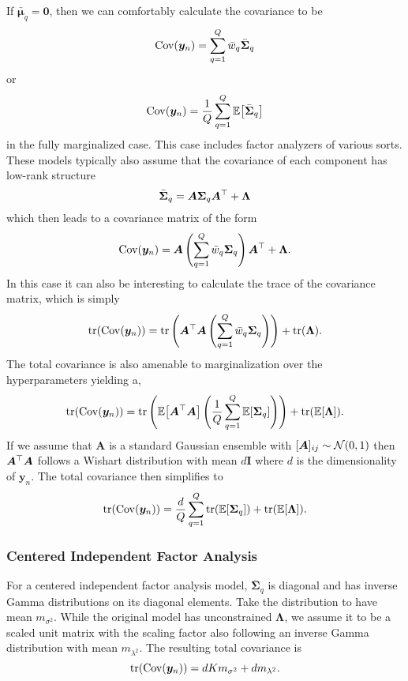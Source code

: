 \documentclass{article}
\newcommand{\mix}{\bm{A}}
\newcommand{\obs}{y}
\newcommand{\obsvec}{\bm{\obs}}
\newcommand{\mean}{\mu}
\newcommand{\meanvec}{\bm{\mean}}
\newcommand{\scale}{\sigma}
\newcommand{\scalesq}{\scale^2}
\newcommand{\sourcecov}{\bm{\Sigma}}
\newcommand{\weight}{w}
\newcommand{\compweight}{\bar{\weight}}
\newcommand{\compmeanvec}{\bar{\meanvec}}
\newcommand{\compcov}{\bar{\bm{\Sigma}}}
\newcommand{\noisecov}{\bm{\Lambda}}
\newcommand{\noisescalesq}{\lambda^2}
\begin{document}
If $\compmeanvec_q=\bm{0}$, then we can comfortably calculate the covariance to be
\begin{equation}
\Cov{\obsvec_n}=\sum_{q=1}^{Q}\compweight_q\compcov_q
\end{equation}
or
\begin{equation}
\Cov{\obsvec_n}=\frac{1}{Q}\sum_{q=1}^{Q}\E{\compcov_q}
\end{equation}
in the fully marginalized case.
This case includes factor analyzers of various sorts. These models typically also assume that the covariance of each component has low-rank structure
\begin{equation}
\compcov_q=\mix \sourcecov_q\mix\T+\noisecov
\end{equation}  
which then leads to a covariance matrix of the form
\begin{equation}
\Cov{\obsvec_n}=\mix\left(\sum_{q=1}^{Q}\compweight_q\sourcecov_q\right)\mix\T+\noisecov.
\end{equation}
In this case it can also be interesting to calculate the trace of the covariance matrix, which is simply
\begin{equation}
\trace(\Cov{\obsvec_n})=\trace\left(\mix\T\mix\left(\sum_{q=1}^{Q}\compweight_q\sourcecov_q\right)\right)+\trace(\noisecov).
\end{equation}
The total covariance is also amenable to marginalization over the hyperparameters yielding a, 
\begin{equation}
\trace(\Cov{\obsvec_n})=\trace\left(\E{\mix\T\mix}\left(\frac{1}{Q}\sum_{q=1}^{Q}\E{\sourcecov_q}\right)\right)+\trace(\E{\noisecov}).
\end{equation}
If we assume that $\mix$ is a standard Gaussian ensemble with $[\mix]_{ij}\sim \gaussrnd(0,1)$ then $\mix\T\mix$ follows a Wishart distribution with mean $d\bm{I}$ where $d$ is the dimensionality of $\obsvec_n$. The total covariance then simplifies to 
\begin{equation}
\label{eq:totalcov}
\trace(\Cov{\obsvec_n})=\frac{d}{Q}\sum_{q=1}^{Q}\trace(\E{\sourcecov_q})+\trace(\E{\noisecov}).
\end{equation}
\subsubsection{Centered Independent Factor Analysis}
For a centered independent factor analysis model, $\compcov_q$ is diagonal and has inverse Gamma distributions on its diagonal elements. Take the distribution to have mean ${m}_{\scalesq}$. While the original model has unconstrained $\noisecov$, we assume it to be a scaled unit matrix with the scaling factor also following an inverse Gamma distribution with mean ${m}_{\noisescalesq}$. The resulting total covariance is
\begin{equation}
\trace(\Cov{\obsvec_n})=dKm_{\scalesq}+dm_{\noisescalesq}.
\end{equation}
\end{document}
